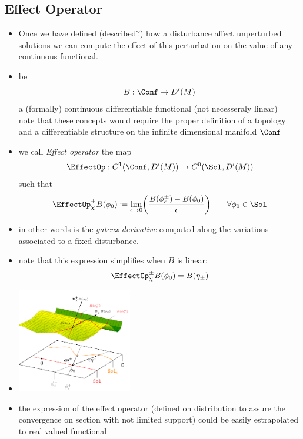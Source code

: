 \documentclass[a4paper,11pt]{scrartcl}
\begin{document}
	\subsection{Effect Operator}
	\begin{itemize}
		\item Once we have defined (described?) how a disturbance affect unperturbed solutions we can compute the effect of this perturbation on the value of any continuous functional.
		\item be
		$$B: \Conf \rightarrow D'(M)$$
		a (formally) continuous differentiable functional (not necesseraly linear)\\
		note that these concepts would require the proper definition of a topology and a differentiable structure on the infinite dimensional manifold $\Conf$
		\item we call \emph{Effect operator} the map
		$$\EffectOp : C^1(\Conf,D'(M)) \rightarrow C^0(\Sol,D'(M))$$
		such that
		$$	\EffectOp_\chi^\pm B ( \phi_0) \coloneqq \lim_{\epsilon \rightarrow 0} \biggr( \frac{B(\phi_\epsilon^\pm) - B (\phi_0)}{\epsilon} \biggr)  \qquad \forall \phi_0 \in \Sol $$
		\item in other words is the \emph{gateux derivative} computed along the variations associated to a fixed disturbance.
		\item note that this expression simplifies when $B$ is linear:
		$$ \EffectOp_\chi^\pm B ( \phi_0) =  B(\eta_\pm) $$
		\item \includegraphics[width=5cm]{../Pictures/GeometricPicture3}
		\item the expression of the effect operator (defined on distribution to assure the convergence on section with not limited support)
		could be easily estrapolated to real valued  functional

	\end{itemize}
\end{document}
